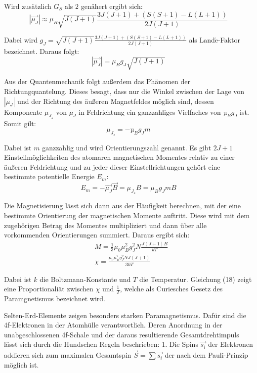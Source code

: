 Wird zusätzlich $G_S$ als $2$ genähert ergibt sich:
\begin{equation}
  |\vec{\mu_J}| \approx \mu_B \sqrt{J(J+1)} \frac{3J(J+1)+ (S(S+1)-L(L+1))}{2J(J+1)}
\end{equation}

Dabei wird $g_J = \sqrt{J(J+1)} \frac{3J(J+1)+ (S(S+1)-L(L+1))}{2J(J+1)}$ als Land$\acute{\text{e}}$-Faktor bezeichnet.
Daraus folgt:
\begin{equation}
  |\vec{\mu_J}| = \mu_B g_J \sqrt{J(J+1)}
\end{equation}

Aus der Quantenmechanik folgt außerdem das Phänomen der Richtungquantelung. Dieses besagt, dass nur die Winkel
zwischen der Lage von $|\mu_J|$ und der Richtung des äußeren Magnetfeldes möglich sind, dessen Komponente
$\mu_{J_z}$ von $\mu_J$ in Feldrichtung ein ganzzahliges Vielfaches von $µ_B g_J$ ist. Somit gilt:
\begin{equation}
  \mu_{J_z} = - µ_B g_J m
\end{equation}

Dabei ist $m$ ganzzahlig und wird Orientierungszahl genannt. Es gibt $2J + 1$ Einstellmöglichkeiten
des atomaren magnetischen Momentes relativ zu einer äußeren Feldrichtung und zu jeder dieser Einstellrichtungen
gehört eine bestimmte potentielle Energie $E_m$:
\begin{equation}
  E_m = - \vec{\mu_J} \vec{B} = \mu_{J_z} B = \mu_B g_J m B
\end{equation}

Die Magnetisierung lässt sich dann aus der Häufigkeit berechnen, mit der eine bestimmte Orientierung
der magnetischen Momente auftritt. Diese wird mit  dem
zugehörigen Betrag des Momentes multipliziert und dann über alle vorkommenden
Orientierungen summiert. Daraus ergibt sich:
\begin{align}
  &M = \frac{1}{3} \mu_0 \mu_B^2 g_J^2 N \frac{J(J+1)B}{kT} \\
  &\chi = \frac{\mu_0 \mu_B^2 g_J^2 N J(J+1)}{3kT}
\end{align}

Dabei ist $k$ die Boltzmann-Konstante und $T$ die Temperatur. Gleichung (18) zeigt eine
Proportionaliät zwischen $\chi$ und $\frac{1}{T}$, welche als Curiesches Gesetz des Paramgnetismus bezeichnet wird.

Selten-Erd-Elemente zeigen besonders starken Paramagnetismus. Dafür sind die 4f-Elektronen in der Atomhülle
verantwortlich. Deren Anordnung in der unabgeschlossenen 4f-Schale und der daraus resultierende Gesamtdrehtimpuls
lässt sich durch die Hundschen Regeln beschrieben:
1. Die Spins $\vec{s_i}$ der Elektronen addieren sich zum maximalen Gesamtspin $\vec{S} = \sum \vec{s_i}$ der nach dem Pauli-Prinzip möglich ist.

